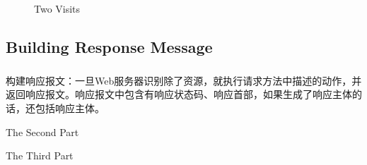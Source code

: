 \documentclass{article}
\begin{document}
	\begin{figure}[htbp]
	\centering    %
		
	 
	\caption{Two Visits} %
	\label{fig:1}  %
	\end{figure}

	\clearpage

	\subsection{Building Response Message}
	\begin{CJK}{UTF8}{gbsn}
		\subparagraph{}
		构建响应报文：一旦Web服务器识别除了资源，就执行请求方法中描述的动作，并返回响应报文。响应报文中包含有响应状态码、响应首部，如果生成了响应主体的话，还包括响应主体。
	\end{CJK}{}

	\clearpage
	\begin{center}
		\Large The Second Part
	\end{center}
	\clearpage
	\begin{center}
		\Large The Third Part
	\end{center}
\end{document}
